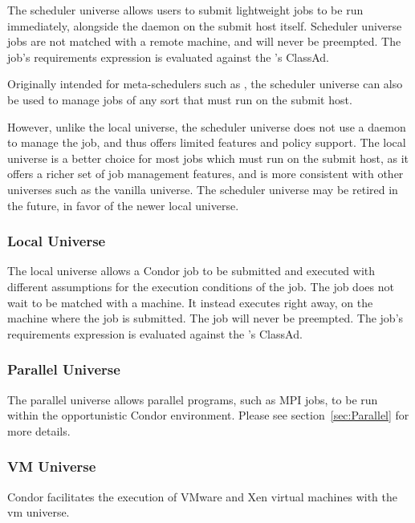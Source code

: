 
The scheduler universe allows users to submit lightweight jobs
to be run immediately, alongside the  daemon on the submit host
itself.
Scheduler universe jobs are not matched with a remote machine,
and will never be preempted.
The job's requirements expression is evaluated against the 's
ClassAd.

Originally intended for meta-schedulers such as ,
the scheduler universe can also be
used to manage jobs of any sort that must run on the submit host.

However, unlike the local universe, the scheduler
universe does not use a  daemon to manage the job, and thus
offers limited features and policy support.  The local universe
is a better choice for most jobs which must run on the submit host, as
it offers a richer set of job management features, and is more
consistent with other universes such as the vanilla universe.
The scheduler universe may be retired in the future, in
favor of the newer local universe.


\subsubsection{\label{sec:local-universe}Local Universe}

The local universe allows a Condor job to be submitted and
executed with different assumptions for the execution conditions
of the job.
The job does not wait to be matched with a machine.
It instead executes right away, on the machine where the job
is submitted.
The job will never be preempted.
The job's requirements expression is evaluated against the 's
ClassAd.

\subsubsection{Parallel Universe}
The parallel universe allows parallel programs, such as MPI jobs,
to be run within the opportunistic Condor environment.
Please see section~\ref{sec:Parallel} for more details.

\subsubsection{VM Universe}
Condor facilitates the execution of VMware and Xen
virtual machines with the vm universe.

